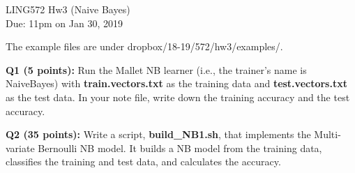 \documentclass[11pt]{article}
\begin{document}
\begin{center}
\LARGE
LING572 Hw3 (Naive Bayes)\\
Due: 11pm on Jan 30, 2019\\
\vspace{0.3in}
\end{center}


The example files are under dropbox/18-19/572/hw3/examples/.

\vspace{0.3 in}
\hspace{-0.3in}
{\bf Q1 (5 points):} Run the Mallet NB learner (i.e., the trainer's name
is NaiveBayes) with {\bf train.vectors.txt} as the training data 
and {\bf test.vectors.txt} as the test data.
In your note file, write down the training accuracy and the test accuracy.



\vspace{0.4 in}

\hspace{-0.3in}
{\bf Q2 (35 points):} Write a script, {\bf build\_NB1.sh}, 
that implements the Multi-variate Bernoulli NB model. It builds a
NB model from the training data, classifies the training and test data, 
and calculates the accuracy. 
\end{document}

